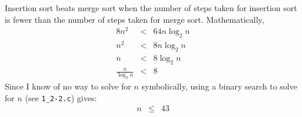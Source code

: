 Insertion sort beats merge sort when the number of steps taken for insertion sort is fewer than the number of steps taken for merge sort. Mathematically,
\begin{eqnarray*}
	8 n^2 & < & 64 n \log_2 n \\
	n^2 & < & 8 n \log_2 n \\
	n & < & 8 \log_2 n \\
	\frac{n}{\log_2 n} & < & 8
\end{eqnarray*}
Since I know of no way to solve for $n$ symbolically, using a binary search to solve for $n$ (see \texttt{1\_2-2.c}) gives:
\begin{eqnarray*}
	n & \leq & 43
\end{eqnarray*}
